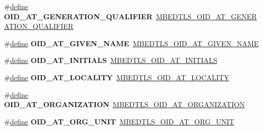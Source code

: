 \begin{DoxyCompactItemize}
\item 
\mbox{\label{compat-1_83_8h_a1702bf9272fafc48fc45cf8cd9ebc1da}} 
\#\hyperlink{structdefine}{define} {\bfseries O\+I\+D\+\_\+\+A\+T\+\_\+\+G\+E\+N\+E\+R\+A\+T\+I\+O\+N\+\_\+\+Q\+U\+A\+L\+I\+F\+I\+ER}~\hyperlink{oid_8h_a0c0354f26066feb3f9da8a92bc7cbfda}{M\+B\+E\+D\+T\+L\+S\+\_\+\+O\+I\+D\+\_\+\+A\+T\+\_\+\+G\+E\+N\+E\+R\+A\+T\+I\+O\+N\+\_\+\+Q\+U\+A\+L\+I\+F\+I\+ER}
\item 
\mbox{\label{compat-1_83_8h_a75a65e602a55bb1dee6ef3758a8956a9}} 
\#\hyperlink{structdefine}{define} {\bfseries O\+I\+D\+\_\+\+A\+T\+\_\+\+G\+I\+V\+E\+N\+\_\+\+N\+A\+ME}~\hyperlink{oid_8h_ad82c6d34c40fd29eda37d7b1f35c7a0f}{M\+B\+E\+D\+T\+L\+S\+\_\+\+O\+I\+D\+\_\+\+A\+T\+\_\+\+G\+I\+V\+E\+N\+\_\+\+N\+A\+ME}
\item 
\mbox{\label{compat-1_83_8h_ab1972fb1073e4db5f3dab0c668fcfc67}} 
\#\hyperlink{structdefine}{define} {\bfseries O\+I\+D\+\_\+\+A\+T\+\_\+\+I\+N\+I\+T\+I\+A\+LS}~\hyperlink{oid_8h_a3dd24fca4f4e7ff5c0fda1b5adc282ea}{M\+B\+E\+D\+T\+L\+S\+\_\+\+O\+I\+D\+\_\+\+A\+T\+\_\+\+I\+N\+I\+T\+I\+A\+LS}
\item 
\mbox{\label{compat-1_83_8h_a8bf92b78c353eb94242c3bb7fb6132a0}} 
\#\hyperlink{structdefine}{define} {\bfseries O\+I\+D\+\_\+\+A\+T\+\_\+\+L\+O\+C\+A\+L\+I\+TY}~\hyperlink{oid_8h_a55a096dbc79a66c4e7729ca795f63bc3}{M\+B\+E\+D\+T\+L\+S\+\_\+\+O\+I\+D\+\_\+\+A\+T\+\_\+\+L\+O\+C\+A\+L\+I\+TY}
\item 
\mbox{\label{compat-1_83_8h_acd142a502a8d344cb50866a943919202}} 
\#\hyperlink{structdefine}{define} {\bfseries O\+I\+D\+\_\+\+A\+T\+\_\+\+O\+R\+G\+A\+N\+I\+Z\+A\+T\+I\+ON}~\hyperlink{oid_8h_ad9db6deb1609351cf1eac7d2ca32b80b}{M\+B\+E\+D\+T\+L\+S\+\_\+\+O\+I\+D\+\_\+\+A\+T\+\_\+\+O\+R\+G\+A\+N\+I\+Z\+A\+T\+I\+ON}
\item 
\mbox{\label{compat-1_83_8h_a63813c045ecc53bdadad08578fb68e09}} 
\#\hyperlink{structdefine}{define} {\bfseries O\+I\+D\+\_\+\+A\+T\+\_\+\+O\+R\+G\+\_\+\+U\+N\+IT}~\hyperlink{oid_8h_af764cca645e3b046a9a001d786d70715}{M\+B\+E\+D\+T\+L\+S\+\_\+\+O\+I\+D\+\_\+\+A\+T\+\_\+\+O\+R\+G\+\_\+\+U\+N\+IT}
\item 
\mbox{\label{compat-1_83_8h_ad2cd0ae349214d5fd83a1b56f188dff1}} 

\end{DoxyCompactItemize}
